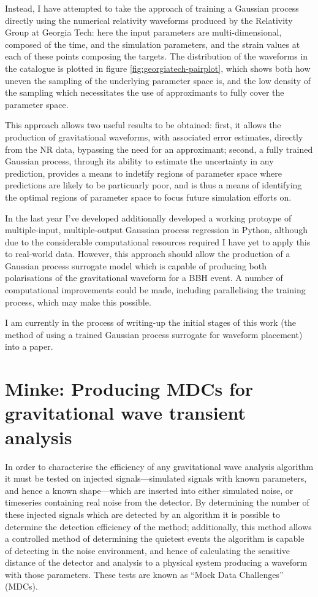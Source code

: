 \documentclass[openleft]{kentigern}
\theoremstyle{definition}
\begin{document}
Instead, I have attempted to take the approach of training a Gaussian
process directly using the numerical relativity waveforms produced by
the Relativity Group at Georgia Tech\cite{gatechcat}: here the input
parameters are multi-dimensional, composed of the time, and the
simulation parameters, and the strain values at each of these points
composing the targets. The distribution of the waveforms in the
catalogue is plotted in figure \ref{fig:georgiatech-pairplot}, which
shows both how uneven the sampling of the underlying parameter space
is, and the low density of the sampling which necessitates the use of
approximants to fully cover the parameter space.

This approach allows two useful results to be obtained: first, it
allows the production of gravitational waveforms, with associated
error estimates, directly from the NR data, bypassing the need for an
approximant; second, a fully trained Gaussian process, through its
ability to estimate the uncertainty in any prediction, provides a
means to indetify regions of parameter space where predictions are
likely to be particuarly poor, and is thus a means of identifying the
optimal regions of parameter space to focus future simulation efforts
on.

In the last year I've developed additionally developed a working
protoype of multiple-input, multiple-output Gaussian process
regression in Python, although due to the considerable computational
resources required I have yet to apply this to real-world
data. However, this approach should allow the production of a Gaussian
process surrogate model which is capable of producing both
polarisations of the gravitational waveform for a BBH event. A number
of computational improvements could be made, including parallelising
the training process, which may make this possible.

I am currently in the process of writing-up the initial stages of this
work (the method of using a trained Gaussian process surrogate for
waveform placement) into a paper.

\section{Minke: Producing MDCs for gravitational wave transient analysis}
\label{sec:mink-prod-mdcs}

In order to characterise the efficiency of any gravitational wave
analysis algorithm it must be tested on injected signals---simulated
signals with known parameters, and hence a known shape---which are
inserted into either simulated noise, or timeseries containing real
noise from the detector. By determining the number of these injected
signals which are detected by an algorithm it is possible to determine
the detection efficiency of the method; additionally, this method
allows a controlled method of determining the quietest events the
algorithm is capable of detecting in the noise environment, and hence
of calculating the sensitive distance of the detector and analysis to
a physical system producing a waveform with those parameters. These
tests are known as ``Mock Data Challenges'' (MDCs).
\end{document}
